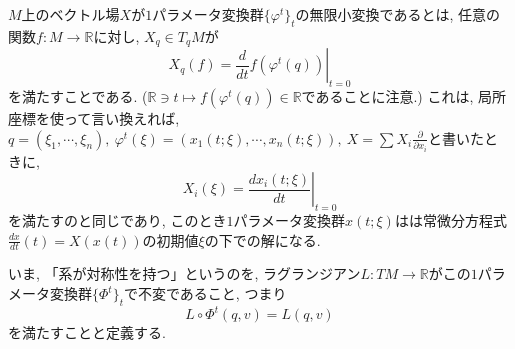 \documentclass[a4paper]{ujarticle}
\numberwithin{equation}{section}
\theoremstyle{definition}
\begin{document}
    $M$上のベクトル場$X$が$1$パラメータ変換群$\{\varphi^{t}\}_{t}$の無限小変換であるとは,
    任意の関数$f: M \rightarrow \mathbb{R}$に対し, $X_{q} \in T_{q} M$が
    \[
        X_{q}(f) = \left.\frac{d}{dt} f(\varphi^{t}(q))\right|_{t = 0}
    \]
    を満たすことである. ($\mathbb{R} \ni t \mapsto f(\varphi^{t}(q)) \in \mathbb{R}$であることに注意.)
    これは, 局所座標を使って言い換えれば, 
    $\displaystyle q = (\xi_1, \cdots, \xi_n), \ \varphi^{t}(\xi) = (x_1(t; \xi), \cdots, x_n(t; \xi)), \ X = \sum X_i \frac{\partial}{\partial x_i}$と書いたときに,
    \[
        X_i(\xi) = \left.\frac{d x_i(t; \xi)}{d t}\right|_{t = 0}
    \]
    を満たすのと同じであり, このとき$1$パラメータ変換群$x(t; \xi)$はは常微分方程式$\frac{d x}{d t}(t) = X(x(t))$の初期値$\xi$の下での解になる.
    
    いま, 「系が対称性を持つ」というのを,
    ラグランジアン$L: TM \rightarrow \mathbb{R}$がこの$1$パラメータ変換群$\{\Phi^{t}\}_{t}$で不変であること, つまり
    \[
        L \circ \Phi^{t}(q, v) = L(q, v)
    \]
    を満たすことと定義する.
\end{document}
